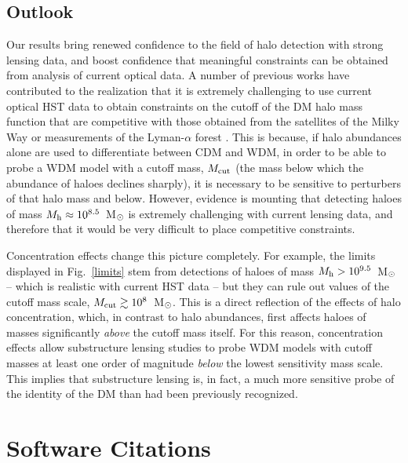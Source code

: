 \documentclass[a4paper, fleqn, usenatbib, useAMS]{mnras}
\begin{document}
\subsection{Outlook}

Our results bring renewed confidence to the field of halo detection
with strong lensing data, and boost confidence that meaningful 
constraints can be obtained from analysis of current optical data. 
A number of previous works have contributed to the realization that it is extremely challenging
to use current optical HST data to obtain constraints on the
cutoff of the DM halo mass function that are competitive with those
obtained from the satellites of the Milky Way or  measurements of the
Lyman-$\alpha$ forest \citep[see][and references therein]{Enzi2021}. 
This is because, if halo abundances alone are used to differentiate
between CDM and WDM,
in order to be able to probe a WDM model with a cutoff mass, $M_{\rm
  cut}$ (the mass below which the abundance of haloes declines sharply), it is necessary to 
be sensitive to perturbers of that halo mass and below. 
However, evidence is mounting that detecting haloes of mass $M_{\rm h}\approx10^{8.5}$~M$_{\rm \odot}$ 
is extremely challenging with current lensing data, and therefore that
it would be very difficult to place competitive constraints. 

Concentration effects change this picture completely. For example, the limits displayed in Fig.~\ref{limits}
stem from detections of haloes of mass $M_{\rm h}>10^{9.5}$~M$_{\rm \odot}$ --
which is realistic with current HST data -- but they can rule out values
of the cutoff mass scale, 
$M_{\rm cut}\gtrsim10^8$~M$_{\rm \odot}$. This is a direct reflection of the effects of halo 
concentration, which, in contrast to halo abundances, first affects
haloes of masses significantly {\it above} the 
cutoff mass itself. For this reason, concentration effects allow substructure lensing studies to probe 
WDM models with cutoff masses at least one order of magnitude {\it below} the lowest sensitivity mass scale.
This implies that substructure lensing is, in fact, a much more
sensitive probe of the identity of  the DM 
than  had been previously recognized. 

\section*{Software Citations}
\end{document}
